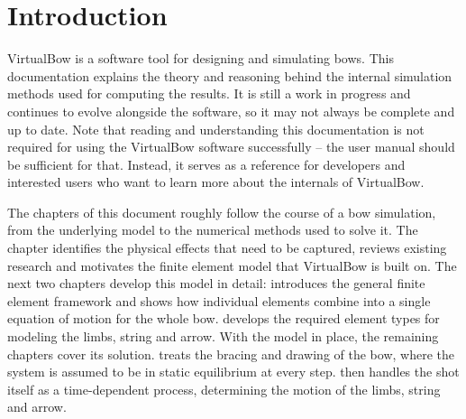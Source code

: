 
\chapter{Introduction}

VirtualBow is a software tool for designing and simulating bows.
This documentation explains the theory and reasoning behind the internal simulation methods used for computing the results.
It is still a work in progress and continues to evolve alongside the software, so it may not always be complete and up to date.
Note that reading and understanding this documentation is not required for using the VirtualBow software successfully -- the user manual should be sufficient for that.
Instead, it serves as a reference for developers and interested users who want to learn more about the internals of VirtualBow.

The chapters of this document roughly follow the course of a bow simulation, from the underlying model to the numerical methods used to solve it.
The \textit{} chapter identifies the physical effects that need to be captured, reviews existing research and motivates the finite element model that VirtualBow is built on.
The next two chapters develop this model in detail: \textit{} introduces the general finite element framework and shows how individual elements combine into a single equation of motion for the whole bow.
\textit{} develops the required element types for modeling the limbs, string and arrow.
With the model in place, the remaining chapters cover its solution.
\textit{} treats the bracing and drawing of the bow, where the system is assumed to be in static equilibrium at every step.
\textit{} then handles the shot itself as a time-dependent process, determining the motion of the limbs, string and arrow.